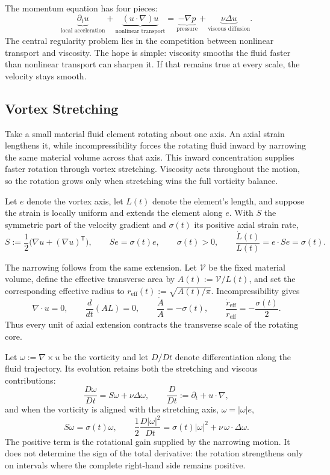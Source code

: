
The momentum equation has four pieces:
\[
  \underbrace{\partial_t u}_{\text{local acceleration}}
  +
  \underbrace{(u\cdot\nabla)u}_{\text{nonlinear transport}}
  =
  \underbrace{-\nabla p}_{\text{pressure}}
  +
  \underbrace{\nu\Delta u}_{\text{viscous diffusion}}.
\]
The central regularity problem lies in the competition between nonlinear transport and viscosity.
The hope is simple: viscosity smooths the fluid faster than nonlinear transport can sharpen it.
If that remains true at every scale, the velocity stays smooth.

\subsection{Vortex Stretching}\label{sub:ThePerfectlyStretchingVortex}

Take a small material fluid element rotating about one axis. An axial strain lengthens it, while incompressibility forces the rotating fluid inward by narrowing the same material volume across that axis. This inward concentration supplies faster rotation through vortex stretching. Viscosity acts throughout the motion, so the rotation grows only when stretching wins the full vorticity balance.

Let \(e\) denote the vortex axis, let \(L(t)\) denote the element's length, and suppose the strain is locally uniform and extends the element along \(e\). With \(S\) the symmetric part of the velocity gradient and \(\sigma(t)\) its positive axial strain rate,
\[
  S:=\frac12\bigl(\nabla u+(\nabla u)^{\mathsf T}\bigr),
  \qquad
  Se=\sigma(t)e,
  \qquad
  \sigma(t)>0,
  \qquad
  \frac{\dot L(t)}{L(t)}
  =
  e\cdot Se
  =
  \sigma(t).
\]

The narrowing follows from the same extension. Let \(\mathcal V\) be the fixed material volume, define the effective transverse area by \(A(t):=\mathcal V/L(t)\), and set the corresponding effective radius to \(r_{\mathrm{eff}}(t):=\sqrt{A(t)/\pi}\). Incompressibility gives
\[
  \nabla\cdot u=0,
  \qquad
  \frac{d}{dt}(A L)=0,
  \qquad
  \frac{\dot A}{A}=-\sigma(t),
  \qquad
  \frac{\dot r_{\mathrm{eff}}}{r_{\mathrm{eff}}}
  =
  -\frac{\sigma(t)}{2}.
\]
Thus every unit of axial extension contracts the transverse scale of the rotating core.

Let \(\omega:=\nabla\times u\) be the vorticity and let \(D/Dt\) denote differentiation along the fluid trajectory. Its evolution retains both the stretching and viscous contributions:
\[
  \frac{D\omega}{Dt}
  =
  S\omega+\nu\Delta\omega,
  \qquad
  \frac{D}{Dt}
  :=
  \partial_t+u\cdot\nabla,
\]
and when the vorticity is aligned with the stretching axis, \(\omega=|\omega|e\),
\[
  S\omega
  =
  \sigma(t)\omega,
  \qquad
  \frac12\frac{D|\omega|^2}{Dt}
  =
  \sigma(t)|\omega|^2
  +
  \nu\,\omega\cdot\Delta\omega.
\]
The positive term is the rotational gain supplied by the narrowing motion. It does not determine the sign of the total derivative: the rotation strengthens only on intervals where the complete right-hand side remains positive.

